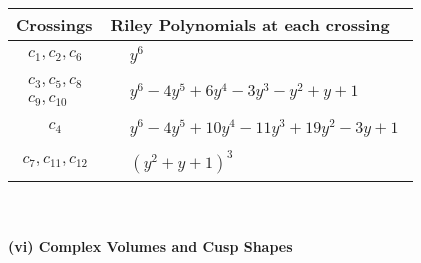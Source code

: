 \documentclass[1p]{elsarticle_modified}
\theoremstyle{definition}
\begin{document}
\begin{tabular}{m{50pt}|m{274pt}}
Crossings & \hspace{64pt}Riley Polynomials at each crossing \\
\hline $$\begin{aligned}c_{1},c_{2},c_{6}\end{aligned}$$&$\begin{aligned}
&y^6
\end{aligned}$\\
\hline $$\begin{aligned}c_{3},c_{5},c_{8}\\c_{9},c_{10}\end{aligned}$$&$\begin{aligned}
&y^6-4 y^5+6 y^4-3 y^3- y^2+y+1
\end{aligned}$\\
\hline $$\begin{aligned}c_{4}\end{aligned}$$&$\begin{aligned}
&y^6-4 y^5+10 y^4-11 y^3+19 y^2-3 y+1
\end{aligned}$\\
\hline $$\begin{aligned}c_{7},c_{11},c_{12}\end{aligned}$$&$\begin{aligned}
&(y^2+y+1)^3
\end{aligned}$\\
\hline
\end{tabular}\\~\\
\newpage\flushleft \textbf{(vi) Complex Volumes and Cusp Shapes}
\end{document}
